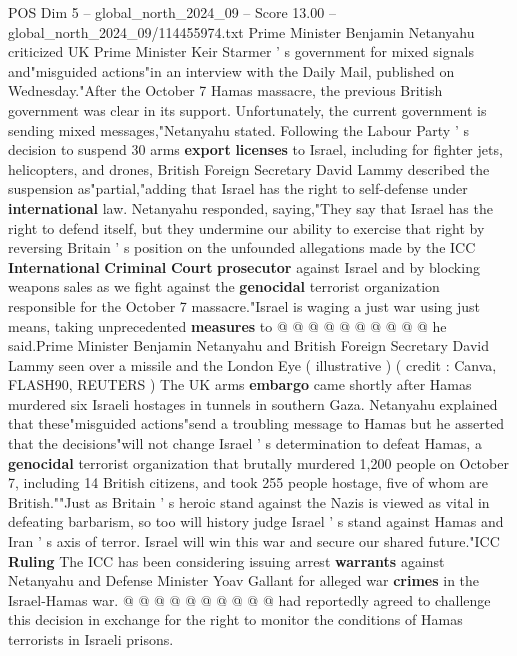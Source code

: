 \begin{textsample}{POS Dim 5 – global\_north\_2024\_09 – Score 13.00 – global\_north\_2024\_09/114455974.txt}  \label{ex:f5_pos_358}
Prime Minister Benjamin Netanyahu criticized UK Prime Minister Keir Starmer ' s government for mixed signals and"misguided actions"in an interview with the Daily Mail, published on Wednesday."After the October 7 Hamas massacre, the previous British government was clear in its support.
Unfortunately, the current government is sending mixed messages,"Netanyahu stated.
Following the Labour Party ' s decision to suspend 30 arms \textbf{export} \textbf{licenses} to Israel, including for fighter jets, helicopters, and drones, British Foreign Secretary David Lammy described the suspension as"partial,"adding that Israel has the right to self-defense under \textbf{international} law.
Netanyahu responded, saying,"They say that Israel has the right to defend itself, but they undermine our ability to exercise that right by reversing Britain ' s position on the unfounded allegations made by the ICC \textbf{International} \textbf{Criminal} \textbf{Court} \textbf{prosecutor} against Israel and by blocking weapons sales as we fight against the \textbf{genocidal} terrorist organization responsible for the October 7 massacre."Israel is waging a just war using just means, taking unprecedented \textbf{measures} to @ @ @ @ @ @ @ @ @ @ he said.Prime Minister Benjamin Netanyahu and British Foreign Secretary David Lammy seen over a missile and the London Eye ( illustrative ) ( credit : Canva, FLASH90, REUTERS ) The UK arms \textbf{embargo} came shortly after Hamas murdered six Israeli hostages in tunnels in southern Gaza.
Netanyahu explained that these"misguided actions"send a troubling message to Hamas but he asserted that the decisions"will not change Israel ' s determination to defeat Hamas, a \textbf{genocidal} terrorist organization that brutally murdered 1,200 people on October 7, including 14 British citizens, and took 255 people hostage, five of whom are British.""Just as Britain ' s heroic stand against the Nazis is viewed as vital in defeating barbarism, so too will history judge Israel ' s stand against Hamas and Iran ' s axis of terror.
Israel will win this war and secure our shared future."ICC \textbf{Ruling} The ICC has been considering issuing arrest \textbf{warrants} against Netanyahu and Defense Minister Yoav Gallant for alleged war \textbf{crimes} in the Israel-Hamas war. @ @ @ @ @ @ @ @ @ @ had reportedly agreed to challenge this decision in exchange for the right to monitor the conditions of Hamas terrorists in Israeli prisons.

\end{textsample}

